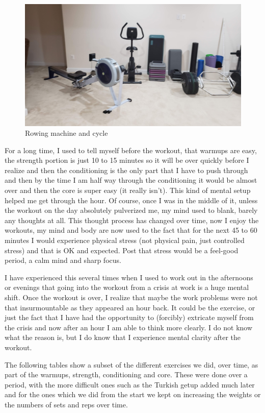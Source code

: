 \documentclass[
  oneside]{book}
\begin{document}
\begin{figure}
\centering
\includegraphics{pictures/gym1.jpg}
\caption{Rowing machine and cycle}
\end{figure}

For a long time, I used to tell myself before the workout, that warmups are easy, the strength portion is just 10 to 15 minutes so it will be over quickly before I realize and then the conditioning is the only part that I have to push through and then by the time I am half way through the conditioning it would be almost over and then the core is super easy (it really isn't). This kind of mental setup helped me get through the hour. Of course, once I was in the middle of it, unless the workout on the day absolutely pulverized me, my mind used to blank, barely any thoughts at all. This thought process has changed over time, now I enjoy the workouts, my mind and body are now used to the fact that for the next 45 to 60 minutes I would experience physical stress (not physical pain, just controlled stress) and that is OK and expected. Post that stress would be a feel-good period, a calm mind and sharp focus.

I have experienced this several times when I used to work out in the afternoons or evenings that going into the workout from a crisis at work is a huge mental shift. Once the workout is over, I realize that maybe the work problems were not that insurmountable as they appeared an hour back. It could be the exercise, or just the fact that I have had the opportunity to (forcibly) extricate myself from the crisis and now after an hour I am able to think more clearly. I do not know what the reason is, but I do know that I experience mental clarity after the workout.

The following tables show a subset of the different exercises we did, over time, as part of the warmups, strength, conditioning and core. These were done over a period, with the more difficult ones such as the Turkish getup added much later and for the ones which we did from the start we kept on increasing the weights or the numbers of sets and reps over time.
\end{document}
